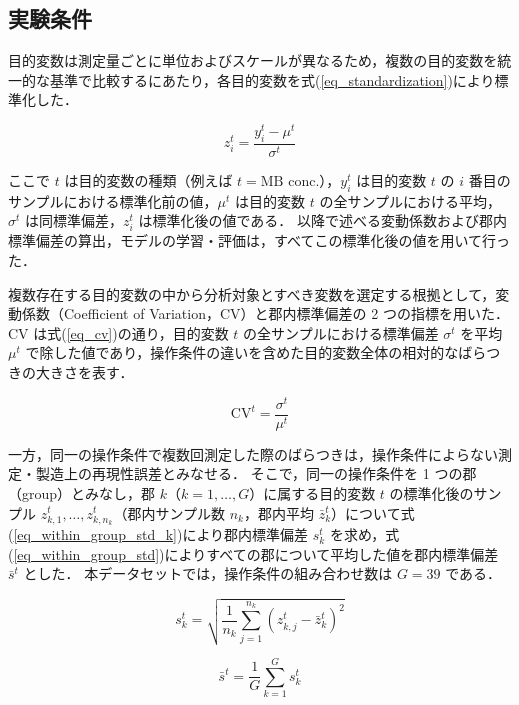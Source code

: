 \subsection{実験条件}
\label{sec_condition}

目的変数は測定量ごとに単位およびスケールが異なるため，複数の目的変数を統一的な基準で比較するにあたり，各目的変数を式(\ref{eq_standardization})により標準化した．

\begin{equation}
    z_i^t = \frac{ y_i^t - \mu^t }{ \sigma^t }
    \label{eq_standardization}
\end{equation}

\noindent
ここで $ t $ は目的変数の種類（例えば $ t = \text{MB conc.} $），$ y_i^t $ は目的変数 $ t $ の $ i $ 番目のサンプルにおける標準化前の値，$ \mu^t $ は目的変数 $ t $ の全サンプルにおける平均，$ \sigma^t $ は同標準偏差，$ z_i^t $ は標準化後の値である．
以降で述べる変動係数および郡内標準偏差の算出，モデルの学習・評価は，すべてこの標準化後の値を用いて行った．

複数存在する目的変数の中から分析対象とすべき変数を選定する根拠として，変動係数（Coefficient of Variation，CV）と郡内標準偏差の 2 つの指標を用いた．
CV は式(\ref{eq_cv})の通り，目的変数 $ t $ の全サンプルにおける標準偏差 $ \sigma^t $ を平均 $ \mu^t $ で除した値であり，操作条件の違いを含めた目的変数全体の相対的なばらつきの大きさを表す．

\begin{equation}
    \mathrm{CV}^t = \frac{ \sigma^t }{ \mu^t }
    \label{eq_cv}
\end{equation}

一方，同一の操作条件で複数回測定した際のばらつきは，操作条件によらない測定・製造上の再現性誤差とみなせる．
そこで，同一の操作条件を 1 つの郡（group）とみなし，郡 $ k $（$ k = 1, \dots, G $）に属する目的変数 $ t $ の標準化後のサンプル $ z_{k,1}^t, \dots, z_{k,n_k}^t $（郡内サンプル数 $ n_k $，郡内平均 $ \bar{z}_k^t $）について式(\ref{eq_within_group_std_k})により郡内標準偏差 $ s_k^t $ を求め，式(\ref{eq_within_group_std})によりすべての郡について平均した値を郡内標準偏差 $ \bar{s}^t $ とした．
本データセットでは，操作条件の組み合わせ数は $ G = 39 $ である．

\begin{equation}
    s_k^t = \sqrt{ \frac{1}{n_k} \sum_{j=1}^{n_k} \left( z_{k,j}^t - \bar{z}_k^t \right)^2 }
    \label{eq_within_group_std_k}
\end{equation}

\begin{equation}
    \bar{s}^t = \frac{1}{G} \sum_{k=1}^{G} s_k^t
    \label{eq_within_group_std}
\end{equation}

